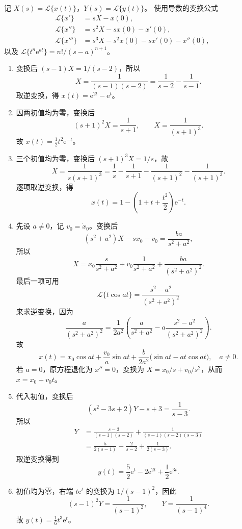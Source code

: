 \documentclass[UTF8,a4paper,11pt]{ctexart}
\newcommand{\e}{\mathrm e}
\begin{document}
\begin{solution}
记 $X(s)=\mathcal L\{x(t)\}$，$Y(s)=\mathcal L\{y(t)\}$。
使用导数的变换公式
\[
\begin{aligned}
\mathcal L\{x'\}&=sX-x(0),\\
\mathcal L\{x''\}&=s^2X-sx(0)-x'(0),\\
\mathcal L\{x'''\}&=s^3X-s^2x(0)-sx'(0)-x''(0),
\end{aligned}
\]
以及 $\mathcal L\{t^n\e^{at}\}=n!/(s-a)^{n+1}$。
\begin{enumerate}[label=(\arabic*)]
\item 变换后 $(s-1)X=1/(s-2)$，所以
\[
X=\frac1{(s-1)(s-2)}=\frac1{s-2}-\frac1{s-1}.
\]
取逆变换，得 $\boxed{x(t)=\e^{2t}-\e^t}$。

\item 因两初值均为零，变换后
\[
(s+1)^2X=\frac1{s+1},\qquad X=\frac1{(s+1)^3}.
\]
故 $\boxed{x(t)=\tfrac12t^2\e^{-t}}$。

\item 三个初值均为零，变换后 $(s+1)^3X=1/s$，故
\[
X=\frac1{s(s+1)^3}
=\frac1s-\frac1{s+1}-\frac1{(s+1)^2}-\frac1{(s+1)^3}.
\]
逐项取逆变换，得
\[
\boxed{x(t)=1-\left(1+t+\frac{t^2}{2}\right)\e^{-t}.}
\]

\item 先设 $a\ne0$，记 $v_0=\dot x_0$。变换后
\[
(s^2+a^2)X-sx_0-v_0=\frac{ba}{s^2+a^2},
\]
所以
\[
X=x_0\frac{s}{s^2+a^2}+v_0\frac1{s^2+a^2}
+\frac{ba}{(s^2+a^2)^2}.
\]
最后一项可用
\[
\mathcal L\{t\cos at\}=\frac{s^2-a^2}{(s^2+a^2)^2}
\]
来求逆变换，因为
\[
\frac{a}{(s^2+a^2)^2}
=\frac1{2a^2}\left(\frac{a}{s^2+a^2}
-a\frac{s^2-a^2}{(s^2+a^2)^2}\right).
\]
故
\[
\boxed{x(t)=x_0\cos at+\frac{v_0}{a}\sin at
+\frac{b}{2a^2}\bigl(\sin at-at\cos at\bigr),\quad a\ne0.}
\]
若 $a=0$，原方程退化为 $x''=0$，变换为 $X=x_0/s+v_0/s^2$，从而 $\boxed{x=x_0+v_0t}$。

\item 代入初值，变换后
\[
(s^2-3s+2)Y-s+3=\frac1{s-3}.
\]
所以
\[
\begin{aligned}
Y&=\frac{s-3}{(s-1)(s-2)}
+\frac1{(s-1)(s-2)(s-3)}\\
&=\frac{5}{2(s-1)}-\frac2{s-2}+\frac1{2(s-3)}.
\end{aligned}
\]
取逆变换得到
\[
\boxed{y(t)=\frac52\e^t-2\e^{2t}+\frac12\e^{3t}.}
\]

\item 初值均为零，右端 $t\e^t$ 的变换为 $1/(s-1)^2$，因此
\[
(s-1)^2Y=\frac1{(s-1)^2},\qquad Y=\frac1{(s-1)^4}.
\]
故 $\boxed{y(t)=\tfrac16t^3\e^t}$。
\end{enumerate}
\end{solution}
\end{document}
